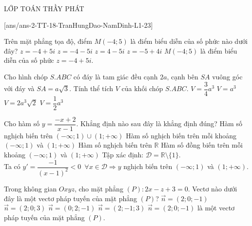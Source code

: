 \begin{name}
	{\tenchude}{\tendethi}{LỚP TOÁN THẦY PHÁT}{\thoigian}
\end{name}
\setcounter{ex}{0}\setcounter{bt}{0}
[ans/ans-2-TT-18-TranHungDao-NamDinh-L1-23]
\begin{ex}%
Trên mặt phẳng tọa độ, điểm $M(-4;5)$ là điểm biểu diễn của số phức nào dưới đây?
\choice 
{\True $z=-4+5i$} 
{$z=-4-5i$}
{$z=4-5i$} 
{$z=-5+4i$}
\loigiai
{
$M(-4;5)$ là điểm biểu diễn của số phức $z=-4+5i$.
}
\end{ex}

\begin{ex}%
Cho hình chóp $S.ABC$ có đáy là tam giác đều cạnh $2a$, cạnh bên $SA$ vuông góc với đáy và $SA=a\sqrt{3}$. Tính thể tích $V$ của khối chóp $S.ABC$.
\choice 
{$V=\dfrac{3}{4}a^3$} 
{\True $V=a^3$}
{$V=2a^3\sqrt{2}$} 
{$V=\dfrac{1}{2}a^3$}
\loigiai
{
}
\end{ex}

\begin{ex}%
Cho hàm số $y=\dfrac{-x+2}{x-1}$. Khẳng định nào sau đây là khẳng định đúng?
\choice 
{Hàm số nghịch biến trên $(-\infty ;1)\cup (1;+\infty )$} 
{\True Hàm số nghịch biến trên mỗi khoảng $(-\infty ;1)$ và $(1;+\infty )$}
{Hàm số nghịch biến trên $\mathbb{R}$} 
{Hàm số đồng biến trên mỗi khoảng $(-\infty ;1)$ và $(1;+\infty )$}
\loigiai
{
Tập xác định: $\mathscr D=\mathbb{R}\setminus\{1\}$.\\
Ta có $y'=\dfrac{-1}{(x-1)^2}<0\,\,\,\forall x\in\mathscr D\Rightarrow y$ nghịch biến trên $(-\infty ;1)$ và $(1;+\infty )$.
}
\end{ex}

\begin{ex}%
Trong không gian $Oxyz$, cho mặt phẳng $(P)\colon 2x-z+3=0$. Vectơ nào dưới đây là một vectơ pháp tuyến của mặt phẳng $(P)$?
\choice 
{\True $\overrightarrow{n}=(2;0;-1)$} 
{$\overrightarrow{n}=(2;0;3)$}
{$\overrightarrow{n}=(0;2;-1)$} 
{$\overrightarrow{n}=(2;-1;3)$}
\loigiai
{
$\overrightarrow{n}=(2;0;-1)$ là một vectơ pháp tuyến của mặt phẳng $(P)$.
}
\end{ex}

